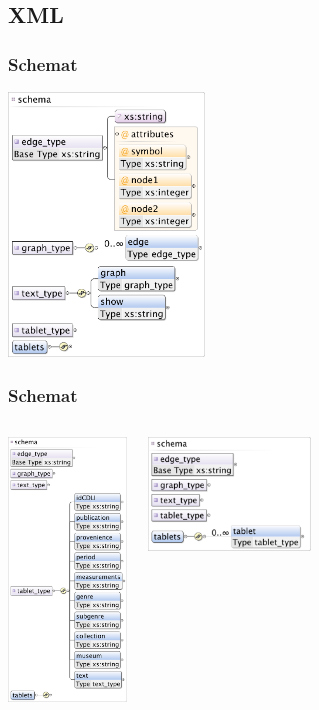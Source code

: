 

\subsection{XML}
\begin{frame}
 \frametitle{Schemat}
\begin{center}
\includegraphics[height=70mm]{../diagramy/schema_text.png}
\end{center}

\end{frame}


\begin{frame}
 \frametitle{Schemat}

\begin{columns}[t]
\column{40mm}
\begin{center}
\includegraphics[height=70mm]{../diagramy/schema_tablet.png}
\end{center}
\column{40mm}
\begin{center}
\includegraphics[height=30mm]{../diagramy/schema_tablets.pdf}
\end{center}
\end{columns}

\end{frame}
